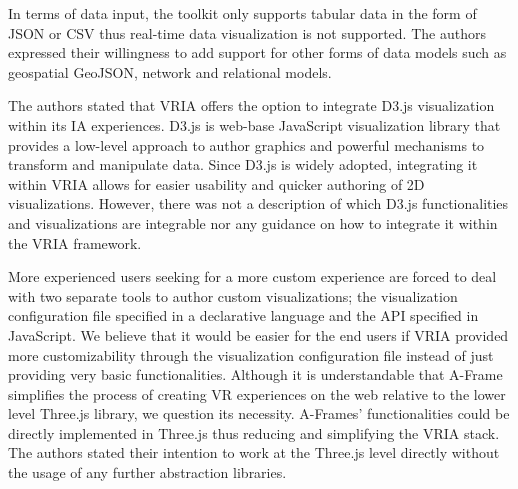 \documentclass{vgtc}                          %
\begin{document}
\smallskip

\noindent In terms of data input, the toolkit only supports tabular data in the form of
JSON or CSV thus real-time data visualization is not supported. The authors
expressed their willingness to add support for other forms of data models such as
geospatial GeoJSON, network and relational models.

\smallskip

\noindent The authors stated that VRIA offers the option to integrate D3.js
visualization within its IA experiences. D3.js is web-base JavaScript
visualization library that provides a low-level approach to author graphics and
powerful mechanisms to transform and manipulate data. Since D3.js is widely
adopted, integrating it within VRIA allows for easier usability and quicker
authoring of 2D visualizations. However, there was not a description of
which D3.js functionalities and visualizations are integrable nor any guidance
on how to integrate it within the VRIA framework.

\smallskip

\noindent More experienced users seeking for a more custom experience are
forced to deal with two separate tools to author custom visualizations;
the visualization configuration file specified in a declarative language and
the API specified in JavaScript. We believe that it would be easier for the end users if VRIA
provided more customizability through the visualization configuration file instead of just
providing very basic functionalities.
Although it is understandable that A-Frame simplifies the process of creating
VR experiences on the web relative to the lower level Three.js library, we
question its necessity. A-Frames' functionalities could be directly implemented
in Three.js thus reducing and simplifying the VRIA stack. The authors stated
their intention to work at the Three.js level directly without the usage of any further
abstraction libraries.

\smallskip
\end{document}
